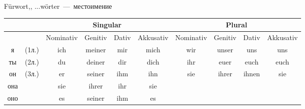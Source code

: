 
 F\"urwort,, ...w\"orter~---~местоимение

\begin{longtable}{|cc|c|c|c|c|c|c|c|c|}
\hline
 & & \multicolumn{4}{|c|}{Singular} & \multicolumn{4}{|c|}{Plural} \\
\hline
 & & Nominativ & Genitiv & Dativ & Akkusativ & Nominativ & Genitiv & Dativ & Akkusativ \\
\hline
я & (1л.) & ich & meiner & mir & mich & wir & unser & uns & uns \\
\hline
ты & (2л.) & du & deiner & dir & dich & ihr & euer & euch & euch \\
\hline
он & \multirow{3}{*}{(3л.)} & er & seiner & ihm & ihn & \multirow{3}{*}{sie} & \multirow{3}{*}{ihrer} & \multirow{3}{*}{ihnen} & \multirow{3}{*}{sie} \\
она & & sie & ihrer & ihr & sie & & & & \\
оно & & es & seiner & ihm & es & & & & \\
\hline
\end{longtable}
